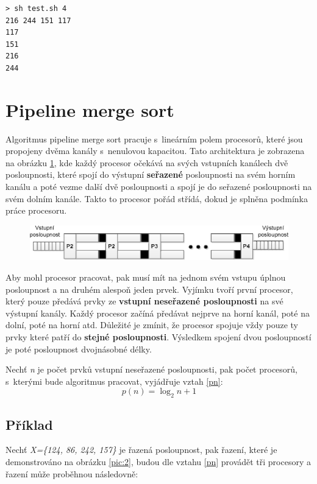 \documentclass[10pt,a4paper,notitlepage]{article}
\begin{document}
\lstset{language=Bash}
\begin{lstlisting}
> sh test.sh 4
216 244 151 117 
117
151
216
244
\end{lstlisting}

\section{Pipeline merge sort}
Algoritmus pipeline merge sort pracuje s~lineárním polem procesorů, které jsou
propojeny dvěma kanály s~nenulovou kapacitou. Tato architektura je zobrazena na
obrázku \ref{pic:3}, kde každý procesor očekává na svých vstupních kanálech dvě
posloupnosti, které spojí do výstupní \textbf{seřazené} posloupnosti na svém horním
kanálu a poté vezme další dvě posloupnosti a spojí je do seřazené posloupnosti
na svém dolním kanále. Takto to procesor pořád střídá, dokud je splněna podmínka
práce procesoru.

\begin{figure}[h]
	\centering
	\includegraphics{pms-arch.eps}
  \label{pic:3}
\end{figure}


Aby mohl procesor pracovat, pak musí mít na jednom svém vstupu úplnou
posloupnost a na druhém alespoň jeden prvek. Vyjímku tvoří první procesor, který
pouze předává prvky ze \textbf{vstupní neseřazené posloupnosti} na své výstupní
kanály. Každý procesor začíná předávat nejprve na horní kanál, poté na dolní,
poté na horní atd. Důležité je zmínit, že procesor spojuje vždy pouze ty prvky
které patří do \textbf{stejné posloupnosti}. Výsledkem spojení dvou posloupností
je poté posloupnost dvojnásobné délky.

Nechť \textit{n} je počet prvků vstupní neseřazené posloupnosti, pak počet
procesorů, s~kterými bude algoritmus pracovat, vyjádřuje vztah \ref{pn}:
\begin{equation} \label{pn}
  p(n) = \log_{2}n+1
\end{equation}
 
\subsection{Příklad}
Nechť \textit{X=\{124, 86, 242, 157\}} je řazená posloupnost, pak řazení, které
je demonstrováno na obrázku \ref{pic:2}, budou dle vztahu \ref{pn} provádět tři
procesory a řazení může proběhnou následovně:
\end{document}
